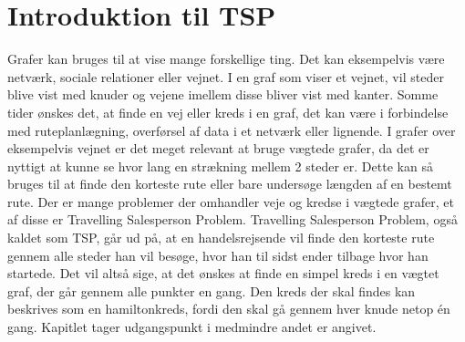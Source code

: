 \section{Introduktion til TSP}
Grafer kan bruges til at vise mange forskellige ting. 
Det kan eksempelvis være netværk, sociale relationer eller vejnet. 
I en graf som viser et vejnet, vil steder blive vist med knuder og vejene imellem disse bliver vist med kanter.
Somme tider ønskes det, at finde en vej eller kreds i en graf, det kan være i forbindelse med ruteplanlægning, overførsel af data i et netværk eller lignende. 
I grafer over eksempelvis vejnet er det meget relevant at bruge vægtede grafer, da det er nyttigt at kunne se hvor lang en strækning mellem 2 steder er.
Dette kan så bruges til at finde den korteste rute eller bare undersøge længden af en bestemt rute. 
Der er mange problemer der omhandler veje og kredse i vægtede grafer, et af disse er Travelling Salesperson Problem.
Travelling Salesperson Problem, også kaldet som TSP, går ud på, at en handelsrejsende vil finde den korteste rute gennem alle steder han vil besøge, hvor han til sidst ender tilbage hvor han startede.
Det vil altså sige, at det ønskes at finde en simpel kreds i en vægtet graf, der går gennem alle punkter en gang. 
Den kreds der skal findes kan beskrives som en hamiltonkreds, fordi den skal gå gennem hver knude netop én gang. Kapitlet tager udgangspunkt i \citep{metrictsp} medmindre andet er angivet.